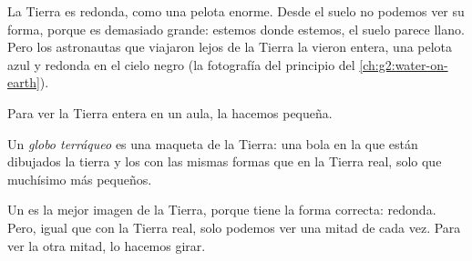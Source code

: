 La Tierra es redonda, como una pelota enorme. Desde el suelo no podemos ver
su forma, porque es demasiado grande: estemos donde estemos, el suelo parece
llano. Pero los astronautas que viajaron lejos de la Tierra la vieron
entera, una pelota azul y redonda en el cielo negro (la fotografía del
principio del \cref{ch:g2:water-on-earth}).

Para ver la Tierra entera en un aula, la hacemos pequeña.

\begin{definition}\label{def:g3:continents-and-oceans:globe}
Un \emph{globo terráqueo} es una
maqueta de la Tierra: una bola en la que están dibujados la tierra y los
 con las mismas formas que en la Tierra real, solo que muchísimo más
pequeños.
\end{definition}

Un  es la mejor imagen de la Tierra, porque tiene la forma
correcta: redonda. Pero, igual que con la Tierra real, solo podemos ver una
mitad de cada vez. Para ver la otra mitad, lo hacemos girar.

